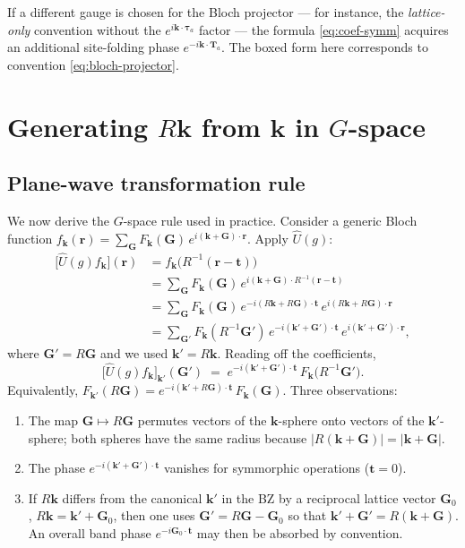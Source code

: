 \documentclass[11pt,a4paper]{article}
\newcommand{\rr}{\mathbf{r}}
\newcommand{\kk}{\mathbf{k}}
\newcommand{\GG}{\mathbf{G}}
\newcommand{\TT}{\mathbf{T}}
\newcommand{\tautau}{\boldsymbol{\tau}}
\newcommand{\tvec}{\mathbf{t}}
\newcommand{\Uhat}{\hat{U}}
\begin{document}
If a different gauge is chosen for the Bloch projector --- for instance, the
\emph{lattice-only} convention without the $e^{i\kk\cdot\tautau_a}$ factor ---
the formula \eqref{eq:coef-symm} acquires an additional site-folding phase
$e^{-i\kk\cdot\TT_a}$. The boxed form here corresponds to convention
\eqref{eq:bloch-projector}.

\section{Generating $R\kk$ from $\kk$ in $G$-space}

\subsection{Plane-wave transformation rule}

We now derive the $G$-space rule used in practice. Consider a generic Bloch
function $f_\kk(\rr) = \sum_\GG F_\kk(\GG)\, e^{i(\kk+\GG)\cdot\rr}$. Apply
$\Uhat(g)$:
\begin{align}
\bigl[\Uhat(g) f_\kk\bigr](\rr)
  &= f_\kk\bigl(R^{-1}(\rr - \tvec)\bigr) \nonumber\\
  &= \sum_\GG F_\kk(\GG)\, e^{i(\kk + \GG)\cdot R^{-1}(\rr - \tvec)} \nonumber\\
  &= \sum_\GG F_\kk(\GG)\, e^{-i(R\kk + R\GG)\cdot\tvec}\,
                       e^{i(R\kk + R\GG)\cdot\rr} \nonumber\\
  &= \sum_{\GG'} F_\kk(R^{-1}\GG')\, e^{-i(\kk' + \GG')\cdot\tvec}\,
                       e^{i(\kk' + \GG')\cdot\rr},
\end{align}
where $\GG' = R\GG$ and we used $\kk' = R\kk$. Reading off the coefficients,
\begin{equation}
\boxed{\;
\bigl[\Uhat(g) f_\kk\bigr]_{\kk'}\!(\GG')
  \;=\; e^{-i(\kk' + \GG')\cdot\tvec}\,F_\kk\bigl(R^{-1}\GG'\bigr).
\;}
\label{eq:G-space-rotation}
\end{equation}
Equivalently, $F_{\kk'}(R\GG) = e^{-i(\kk' + R\GG)\cdot\tvec}\,F_\kk(\GG)$.
Three observations:
\begin{enumerate}[leftmargin=*]
\item The map $\GG \mapsto R\GG$ permutes vectors of the $\kk$-sphere onto
      vectors of the $\kk'$-sphere; both spheres have the same radius because
      $|R(\kk+\GG)| = |\kk + \GG|$.
\item The phase $e^{-i(\kk'+\GG')\cdot\tvec}$ vanishes for symmorphic operations
      ($\tvec = 0$).
\item If $R\kk$ differs from the canonical $\kk'$ in the BZ by a reciprocal
      lattice vector $\GG_0$, $R\kk = \kk' + \GG_0$, then one uses
      $\GG' = R\GG - \GG_0$ so that $\kk' + \GG' = R(\kk + \GG)$. An overall
      band phase $e^{-i\GG_0\cdot\tvec}$ may then be absorbed by convention.
\end{enumerate}
\end{document}
